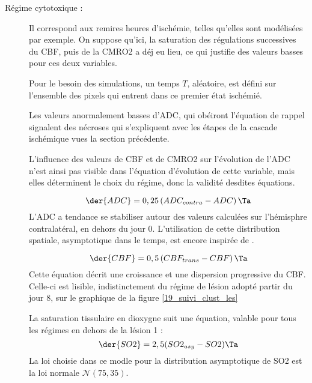 \begin{description}
\item[R\'egime cytotoxique :] Il correspond aux remires heures d'isch\'emie, telles qu'elles sont mod\'elis\'ees par exemple. %
On suppose qu'ici, la saturation des r\'egulations successives du CBF, puis de la CMRO2 a d\'ej eu lieu, ce qui justifie des valeurs basses pour ces deux variables.

\par
Pour le besoin des simulations, un temps $T$, al\'eatoire, est d\'efini sur l'ensemble des pixels qui entrent dans ce premier \'etat isch\'emi\'e.

\par
Les valeurs anormalement basses d'ADC, qui ob\'eiront  l'\'equation de rappel%
signalent des n\'ecroses qui s'expliquent avec les \'etapes de la cascade isch\'emique vues  la section pr\'ec\'edente.

\par
L'influence des valeurs de CBF et de CMRO2 sur l'\'evolution de l'ADC n'est ainsi pas visible dans l'\'equation d'\'evolution de cette variable, %
mais elles d\'eterminent le choix du r\'egime, donc la validit\'e desdites \'equations.

\begin{equation}
\der{ADC}=0,25\left(ADC_{contra}-ADC\right) \Ta
\label{adc_is1}
\end{equation}
L'ADC a tendance  se stabiliser autour des valeurs calcul\'ees sur l'h\'emisphre contralat\'eral, en dehors du jour 0. %
L'utilisation de cette distribution spatiale, asymptotique dans le temps, est encore inspir\'ee de \cite{Duval_JCBFM_02}.

\begin{equation}
\der{CBF}=0,5\left(CBF_{trans}-CBF\right) \Ta
\label{cbf_is1}
\end{equation}
Cette \'equation d\'ecrit une croissance et une dispersion progressive du CBF. %
Celle-ci est lisible, indistinctement du r\'egime de l\'esion adopt\'e  partir du jour 8, %
sur le graphique de la figure \ref{19_suivi_clust_les}

La saturation tissulaire en dioxygne suit une \'equation, valable pour tous les r\'egimes en dehors de la \og{} l\'esion 1\fg{} :
\begin{equation}
\der{SO2}=2,5(SO2_{asy}-SO2) \Ta
\label{so2_s_l2}
\end{equation}
La loi choisie dans ce modle pour la distribution asymptotique de SO2 est la loi normale $\mathcal{N}(75,35)$.


\end{description}

